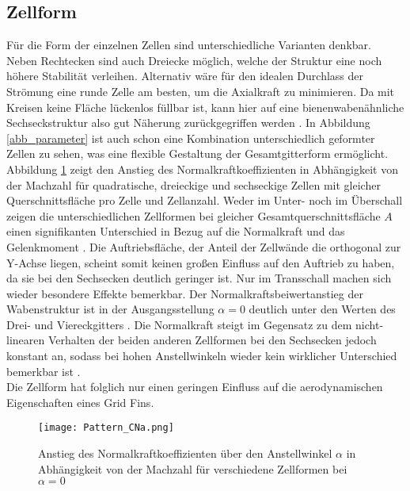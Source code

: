 \subsection{Zellform}
Für die Form der einzelnen Zellen sind unterschiedliche Varianten denkbar. Neben Rechtecken sind auch Dreiecke möglich, welche der Struktur eine noch höhere Stabilität verleihen. Alternativ wäre für den idealen Durchlass der Strömung eine runde Zelle am besten, um die Axialkraft zu minimieren. Da mit Kreisen keine Fläche lückenlos füllbar ist, kann hier auf eine bienenwabenähnliche Sechseckstruktur also gut Näherung zurückgegriffen werden \cite{Pattern}. In Abbildung \ref{abb_parameter} ist auch schon eine Kombination unterschiedlich geformter Zellen zu sehen, was eine flexible Gestaltung der Gesamtgitterform ermöglicht.\\
Abbildung \ref{abb_Form-Cn} zeigt den Anstieg des Normalkraftkoeffizienten in Abhängigkeit von der Machzahl für quadratische, dreieckige und sechseckige Zellen mit gleicher Querschnittsfläche pro Zelle und Zellanzahl.
Weder im Unter- noch im Überschall zeigen die unterschiedlichen Zellformen bei gleicher Gesamtquerschnittsfläche $A$ einen signifikanten Unterschied in Bezug auf die Normalkraft und das Gelenkmoment \cite{Pattern}. Die Auftriebsfläche, der Anteil der Zellwände die orthogonal zur Y-Achse liegen, scheint somit keinen großen Einfluss auf den Auftrieb zu haben, da sie bei den Sechsecken deutlich geringer ist. Nur im Transschall machen sich wieder besondere Effekte bemerkbar. Der Normalkraftsbeiwertanstieg der Wabenstruktur ist in der Ausgangsstellung $\alpha = 0$ deutlich unter den Werten des Drei- und Viereckgitters \cite{Pattern}. Die Normalkraft steigt im Gegensatz zu dem nicht-linearen Verhalten der beiden anderen Zellformen bei den Sechsecken jedoch konstant an, sodass bei hohen Anstellwinkeln wieder kein wirklicher Unterschied bemerkbar ist \cite{Pattern}.\\
Die Zellform hat folglich nur einen geringen Einfluss auf die aerodynamischen Eigenschaften eines Grid Fins.
\begin{figure}[h]
	\centering
	\texttt{[image: Pattern\_CNa.png]}
	\begin{flushright}
	\end{flushright}
	\caption{Anstieg des Normalkraftkoeffizienten über den Anstellwinkel $\alpha$ in Abhängigkeit von der Machzahl für verschiedene Zellformen bei $\alpha = 0$}
	\label{abb_Form-Cn}
\end{figure}
